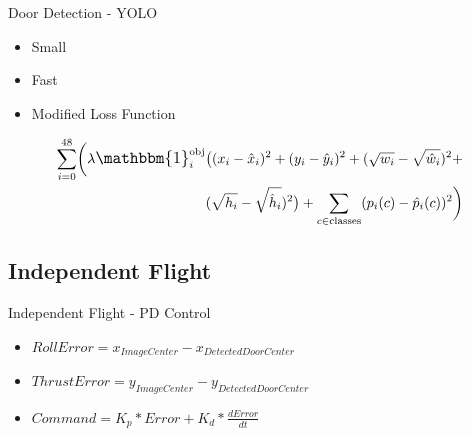 \documentclass[xcolor=x11names,compress]{beamer}
\begin{document}
\begin{frame}{Door Detection - YOLO}
	\begin{itemize}
        \item Small
        \item Fast
        \item Modified Loss Function
	\end{itemize}
    \begin{equation}
        \begin{aligned}
            \sum_{i = 0}^{48} \biggl( \lambda \mathlarger{\mathbbm{1}}_i^{\text{obj}}\bigl((x_i - \hat{x}_i)^2 + (y_i - \hat{y}_i)^2 + (\sqrt{w_i} - \sqrt{\hat{w}_i})^2 + \\
            (\sqrt{h_i} -\sqrt{\hat{h}_i})^2\bigr) + \sum_{c \in \text{classes}} (p_i(c) - \hat{p}_i(c))^2 \biggr)
        \end{aligned}
    \end{equation}
    \tiny\cite{yolov3}
\end{frame}



\subsection{Independent Flight}
\begin{frame}{Independent Flight - PD Control}
	\begin{itemize}
        \item $RollError = x_{ImageCenter}  - x_{DetectedDoorCenter}$
        \item $ThrustError = y_{ImageCenter}  - y_{DetectedDoorCenter}$
        \item $Command = K_{p}*Error + K_{d} * \frac{dError}{dt}$
	\end{itemize}

\end{frame}
\end{document}
